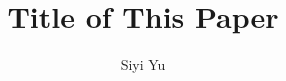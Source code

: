 \documentclass{amsart}
\begin{document}
%
%
\title[Report for FilP]{Title of This Paper}%

\author{Siyi Yu}
\address[A.~1]{School of Computer Science,\\ 
Jilin University, Changchun 130000, China}%




%
\date{\gitAuthorDate}%

%


\maketitle
\tableofcontents

\newpage



%
%

\end{document}
